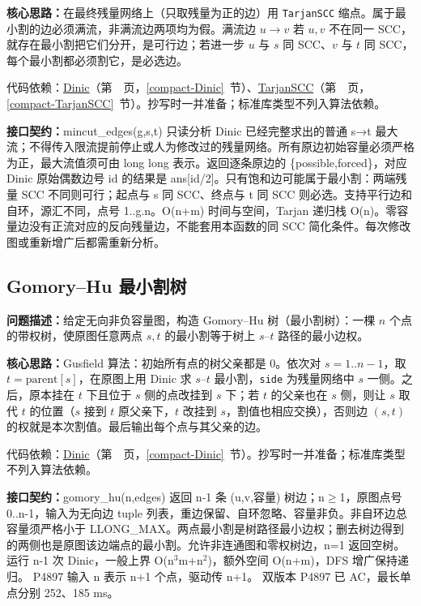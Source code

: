 \textbf{核心思路：}\allowbreak 在最终残量网络上（只取残量为正的边）用 \texttt{TarjanSCC} 缩点。属于最小割的边必须满流，非满流边两项均为假。满流边 $u\to v$ 若 $u,v$ 不在同一 SCC，就存在最小割把它们分开，是可行边；若进一步 $u$ 与 $s$ 同 SCC、$v$ 与 $t$ 同 SCC，每个最小割都必须割它，是必选边。

代码依赖：\hyperref[compact-Dinic]{Dinic}（第~\pageref{compact-Dinic}~页，\ref{compact-Dinic}~节）、\hyperref[compact-TarjanSCC]{TarjanSCC}（第~\pageref{compact-TarjanSCC}~页，\ref{compact-TarjanSCC}~节）。抄写时一并准备；标准库类型不列入算法依赖。

{\sloppy{}\noindent\textbf{接口契约：}mincut\_edges(g,s,t) 只读分析 Dinic 已经完整求出的普通 s→t 最大流；不得传入限流提前停止或人为修改过的残量网络。所有原边初始容量必须严格为正，最大流值须可由 long long 表示。返回逐条原边的 \{possible,forced\}，对应 Dinic 原始偶数边号 id 的结果是 ans[id/2]。只有饱和边可能属于最小割：两端残量 SCC 不同则可行；起点与 s 同 SCC、终点与 t 同 SCC 则必选。支持平行边和自环，源汇不同，点号 1..g.n。O(n+m) 时间与空间，Tarjan 递归栈 O(n)。零容量边没有正流对应的反向残量边，不能套用本函数的同 SCC 简化条件。每次修改图或重新增广后都需重新分析。\par}



\Needspace{594pt}

\subsection{Gomory--Hu 最小割树}\label{compact-gomory_hu}

\noindent\textbf{问题描述：}\allowbreak 给定无向非负容量图，构造 Gomory–Hu 树（最小割树）：一棵 $n$ 个点的带权树，使原图任意两点 $s,t$ 的最小割等于树上 $s$--$t$ 路径的最小边权。

\textbf{核心思路：}\allowbreak Gusfield 算法：初始所有点的树父亲都是 0。依次对 $s=1..n-1$，取 $t=\mathrm{parent}[s]$，在原图上用 Dinic 求 $s$--$t$ 最小割，\texttt{side} 为残量网络中 $s$ 一侧。之后，原本挂在 $t$ 下且位于 $s$ 侧的点改挂到 $s$ 下；若 $t$ 的父亲也在 $s$ 侧，则让 $s$ 取代 $t$ 的位置（$s$ 接到 $t$ 原父亲下，$t$ 改挂到 $s$，割值也相应交换），否则边 $(s,t)$ 的权就是本次割值。最后输出每个点与其父亲的边。

代码依赖：\hyperref[compact-Dinic]{Dinic}（第~\pageref{compact-Dinic}~页，\ref{compact-Dinic}~节）。抄写时一并准备；标准库类型不列入算法依赖。

{\sloppy{}\noindent\textbf{接口契约：}gomory\_hu(n,edges) 返回 n-1 条 (u,v,容量) 树边；n$\ge$1，原图点号 0..n-1，输入为无向边 tuple 列表，重边保留、自环忽略、容量非负。非自环边总容量须严格小于 LLONG\_MAX。两点最小割是树路径最小边权；删去树边得到的两侧也是原图该边端点的最小割。允许非连通图和零权树边，n=1 返回空树。运行 n-1 次 Dinic，一般上界 O(n$^{3}$m+n$^{2}$)，额外空间 O(n+m)，DFS 增广保持递归。 P4897 输入 n 表示 n+1 个点，驱动传 n+1。 双版本 P4897 已 AC，最长单点分别 252、185 ms。\par}

